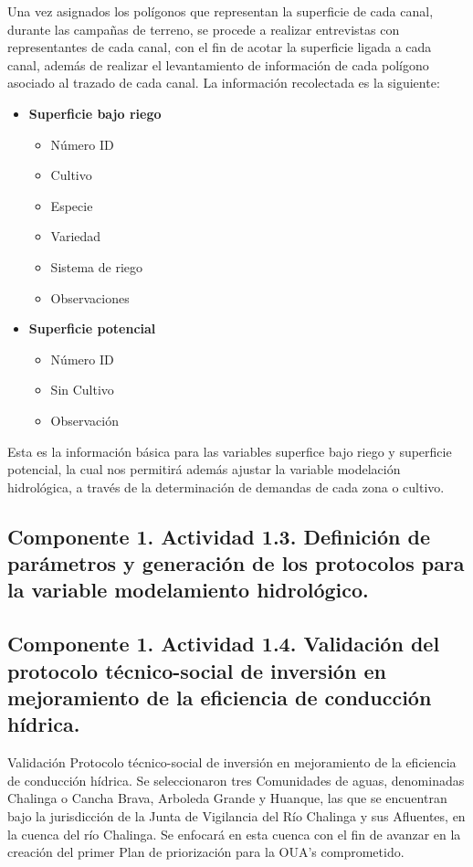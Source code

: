 \documentclass[]{article}
\begin{document}
Una vez asignados los polígonos que representan la superficie de cada canal, durante las campañas de terreno, se procede a realizar entrevistas con representantes de cada canal, con el fin de acotar la superficie ligada a cada canal, además de realizar el levantamiento de información de cada polígono asociado al trazado de cada canal. La información recolectada es la siguiente:

\begin{itemize}
	\item \textbf{Superficie bajo riego}
	\begin{itemize}	
		\item Número ID
		\item Cultivo
		\item Especie
		\item Variedad
		\item Sistema de riego
		\item Observaciones
	\end{itemize}
	\item \textbf{Superficie potencial}
	\begin{itemize}	
		\item Número ID
		\item Sin Cultivo
		\item Observación
	\end{itemize}
\end{itemize}

Esta es la información básica para las variables superfice bajo riego y superficie potencial, la cual nos permitirá además ajustar la variable modelación hidrológica, a través de la determinación de demandas de cada zona o cultivo.

\subsection{Componente 1. Actividad 1.3. Definición de parámetros y generación de los protocolos para la variable modelamiento hidrológico.}


\subsection{Componente 1. Actividad 1.4. Validación del protocolo técnico-social de inversión en mejoramiento de la eficiencia de conducción hídrica.}

Validación Protocolo técnico-social de inversión en mejoramiento de la eficiencia de conducción hídrica. Se seleccionaron tres Comunidades de aguas, denominadas Chalinga o Cancha Brava, Arboleda Grande y Huanque, las que se encuentran bajo la jurisdicción de la Junta de Vigilancia del Río Chalinga y sus Afluentes, en la cuenca del río Chalinga. Se enfocará en esta cuenca con el fin de avanzar en la creación del primer Plan de priorización para la OUA's comprometido.
\end{document}

